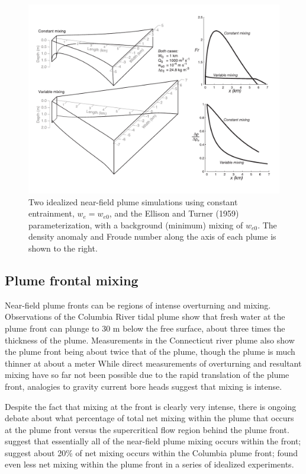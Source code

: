 \documentclass[12pt]{article}
\begin{document}
\begin{figure}
    \centering
    \includegraphics[width=6.5in]{Figures/plume3d_Fr_dr.pdf}
    \caption{Two idealized near-field plume simulations using constant entrainment, $w_e=w_{e0}$, and the Ellison and Turner (1959) parameterization, with a background (minimum) mixing of $w_{e0}$. The density anomaly and Froude number along the axis of each plume is shown to the right.}
    \label{fig:plume3d_Fr_dr}
\end{figure}

\subsection{Plume frontal mixing}

Near-field plume fronts can be regions of intense overturning and mixing. Observations of the Columbia River tidal plume show that fresh water at the plume front can plunge to 30 m below the free surface, about three times the thickness of the plume. Measurements in the Connecticut river plume also show the plume front being about twice that of the plume, though the plume is much thinner at about a meter \citep{odonnell.ea:98} While direct measurements of overturning and resultant mixing have so far not been possible due to the rapid translation of the plume front, analogies to gravity current bore heads suggest that mixing is intense.

Despite the fact that mixing at the front is clearly very intense, there is ongoing debate about what percentage of total net mixing within the plume that occurs at the plume front versus the supercritical flow region behind the plume front. \citet{pritchard.huntley:06} suggest that essentially all of the near-field plume mixing occurs within the front; \citet{orton.jay:05} suggest about 20\% of net mixing occurs within the Columbia plume front; \citet{cole:14} found even less net mixing within the plume front in a series of idealized experiments.
\end{document}
